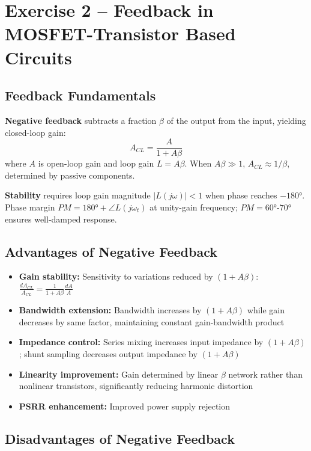 \documentclass[main.tex]{subfiles}
\begin{document}
\section{Exercise 2 – Feedback in MOSFET-Transistor Based Circuits}

\subsection*{Feedback Fundamentals}

\textbf{Negative feedback} subtracts a fraction $\beta$ of the output from the input, yielding closed-loop gain:
$$A_{CL} = \frac{A}{1 + A\beta}$$
where $A$ is open-loop gain and loop gain $L = A\beta$. When $A\beta \gg 1$, $A_{CL} \approx 1/\beta$, determined by passive components.

\textbf{Stability} requires loop gain magnitude $|L(j\omega)| < 1$ when phase reaches $-180°$. Phase margin $PM = 180° + \angle L(j\omega_t)$ at unity-gain frequency; $PM = 60°$-$70°$ ensures well-damped response.

\subsection*{Advantages of Negative Feedback}

\begin{itemize}
    \item \textbf{Gain stability:} Sensitivity to variations reduced by $(1+A\beta)$: $\frac{dA_{CL}}{A_{CL}} = \frac{1}{1+A\beta}\frac{dA}{A}$
    \item \textbf{Bandwidth extension:} Bandwidth increases by $(1+A\beta)$ while gain decreases by same factor, maintaining constant gain-bandwidth product
    \item \textbf{Impedance control:} Series mixing increases input impedance by $(1+A\beta)$; shunt sampling decreases output impedance by $(1+A\beta)$
    \item \textbf{Linearity improvement:} Gain determined by linear $\beta$ network rather than nonlinear transistors, significantly reducing harmonic distortion
    \item \textbf{PSRR enhancement:} Improved power supply rejection
\end{itemize}

\subsection*{Disadvantages of Negative Feedback}
\end{document}
